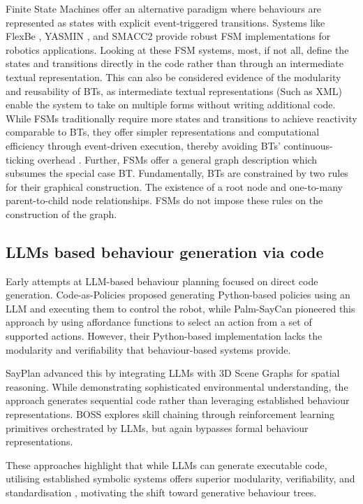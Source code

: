 \documentclass[letterpaper, 10pt, conference]{ieeeconf}      %
\begin{document}
Finite State Machines offer an alternative paradigm where behaviours are represented as states with explicit event-triggered transitions. Systems like FlexBe \cite{zutell_ros_2022}, YASMIN \cite{gonzalez-santamarta_yasmin_2023}, and SMACC2 provide robust FSM implementations for robotics applications. Looking at these FSM systems, most, if not all, define the states and transitions directly in the code rather than through an intermediate textual representation. This can also be considered evidence of the modularity and reusability of BTs, as intermediate textual representations (Such as XML) enable the system to take on multiple forms without writing additional code.  While FSMs traditionally require more states and transitions to achieve reactivity comparable to BTs, they offer simpler representations and computational efficiency through event-driven execution, thereby avoiding BTs' continuous-ticking overhead \cite{iovino_comparison_2024}. Further, FSMs offer a general graph description which subsumes the special case BT. Fundamentally, BTs are constrained by two rules for their graphical construction. The existence of a root node and one-to-many parent-to-child node relationships. FSMs do not impose these rules on the construction of the graph.

\subsection{LLMs based behaviour generation via code}

Early attempts at LLM-based behaviour planning focused on direct code generation. Code-as-Policies \cite{liang_code_2023} proposed generating Python-based policies using an LLM and executing them to control the robot, while Palm-SayCan \cite{ahn_as_2022} pioneered this approach by using affordance functions to select an action from a set of supported actions. However, their Python-based implementation lacks the modularity and verifiability that behaviour-based systems provide.

SayPlan \cite{rana_sayplan_2023} advanced this by integrating LLMs with 3D Scene Graphs for spatial reasoning. While demonstrating sophisticated environmental understanding, the approach generates sequential code rather than leveraging established behaviour representations. BOSS \cite{zhang_bootstrap_2023} explores skill chaining through reinforcement learning primitives orchestrated by LLMs, but again bypasses formal behaviour representations.

These approaches highlight that while LLMs can generate executable code, utilising established symbolic systems offers superior modularity, verifiability, and standardisation \cite{ahn_as_2022}, motivating the shift toward generative behaviour trees.
\end{document}
